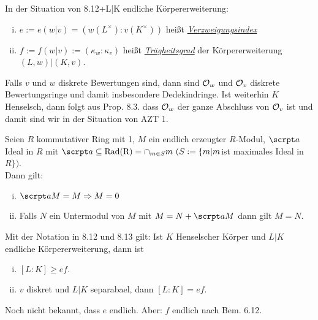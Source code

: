 \begin{defi}
In der Situation von 8.12+L|K endliche Körpererweiterung:
\begin{enumerate}[i)]
\item $e:=e(w|v)=(w(L^\times):v(K^\times))$ heißt \underline{\emph{Verzweigungsindex}}
\item $f:=f(w|v):=(\kappa_w:\kappa_v)$ heißt \underline{\emph{Trägheitsgrad}} der Körpererweiterung $(L,w)|(K,v)$.
\end{enumerate}
\end{defi}

\begin{Bem}
Falls $v$ und $w$ diskrete Bewertungen sind, dann sind $\mathcal{O}_w$ und $\mathcal{O}_v$ diskrete Bewertungsringe und damit insbesondere Dedekindringe. Ist weiterhin $K$ Henselsch, dann folgt aus Prop. 8.3. dass $\mathcal{O}_w$ der ganze Abschluss von $\mathcal{O}_v$ ist und damit sind wir in der Situation von AZT 1.
\end{Bem}

\begin{Fakt}
Seien $R$ kommutativer Ring mit 1, $M$ ein endlich erzeugter $R$-Modul, $\a$ Ideal in $R$ mit $\a \subseteq \mathrm{Rad(R)}=\cap_{m \in S} m \ (S:=\{m | m  $ist maximales Ideal in $ R\})$.\\
Dann gilt:
\begin{enumerate}[i)]
\item $\a M=M \Rightarrow M=0$
\item Falls $N$ ein Untermodul von $M$ mit $M=N+\a M$ dann gilt $M=N$.
\end{enumerate}
\end{Fakt}

\begin{Prop}
Mit der Notation in 8.12 und 8.13 gilt: Ist $K$ Henselscher Körper und $L|K$ endliche Körpererweiterung, dann ist
\begin{enumerate}[i)]
\item $[L:K] \geq ef.$
\item $v$ diskret und $L|K$ separabael, dann $[L:K]=ef$.
\end{enumerate}
\danger Noch nicht bekannt, dass $e$ endlich. Aber: $f$ endlich nach Bem. 6.12.
\end{Prop}